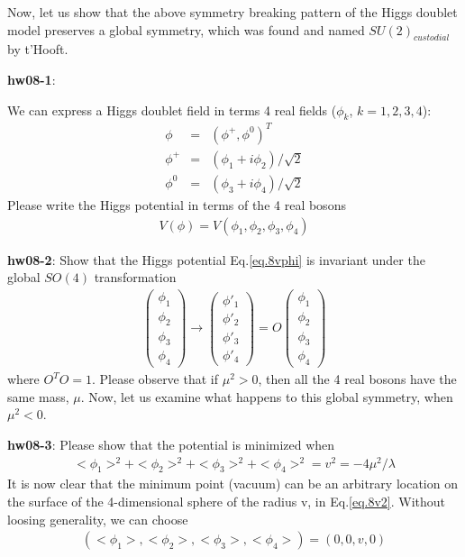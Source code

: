 \documentclass[12pt]{article}
\begin{document}
  Now, let us show that the above symmetry breaking pattern of the
  Higgs doublet model preserves a global symmetry, which was found
  and named $SU(2)_{custodial}$ by t'Hooft.

{\bf hw08-1}:

  We can express a Higgs doublet field in terms 4 real fields
  ($\phi_k$, $k=1,2,3,4$):
\begin{eqnarray}
  \phi &=& ( \phi^+, \phi^0 )^T  \label{eq.8phi1}\\
  \phi^+ &=& ( \phi_1 + i\phi_2 )/\sqrt2 \label{eq.8phi2}\\
  \phi^0 &=& ( \phi_3 + i\phi_4 )/\sqrt2 \label{eq.8phi3}
\end{eqnarray}
  Please write the Higgs potential in terms of the 4 real bosons
\begin{eqnarray}
  V(\phi) = V(\phi_1,\phi_2,\phi_3,\phi_4) \label{eq.8vphi}
\end{eqnarray}

{\bf hw08-2}:
  Show that the Higgs potential Eq.\ref{eq.8vphi} is invariant under the global
  $SO(4)$ transformation
  \begin{eqnarray}
    \begin{pmatrix}
      \phi_1 \\ \phi_2 \\ \phi_3 \\ \phi_4
    \end{pmatrix}
    \to
    \begin{pmatrix}
      \phi'_1 \\ \phi'_2 \\ \phi'_3 \\ \phi'_4
    \end{pmatrix}
    =O
    \begin{pmatrix}
      \phi_1 \\ \phi_2 \\ \phi_3 \\ \phi_4
    \end{pmatrix}
  \end{eqnarray}
  where $O^T O = 1$.  Please observe that if $\mu^2>0$, then all the
  4 real bosons have the same mass, $\mu$.
  Now, let us examine what happens to this global symmetry,
  when $\mu^2 < 0$.

{\bf hw08-3}:
  Please show that the potential is minimized when
  \begin{eqnarray}
    <\phi_1>^2 + <\phi_2>^2 + <\phi_3>^2 + <\phi_4>^2
    = v^2
    = -4\mu^2/\lambda \label{eq.8v2}
  \end{eqnarray}
  It is now clear that the minimum point (vacuum) can be an arbitrary
  location on the surface of the 4-dimensional sphere of the radius v,
  in Eq.\ref{eq.8v2}.
  Without loosing generality, we can choose
  \begin{eqnarray}
    (<\phi_1>,<\phi_2>,<\phi_3>,<\phi_4>) = (0,0,v,0) \label{eq.84rbv}
  \end{eqnarray}
\end{document}
